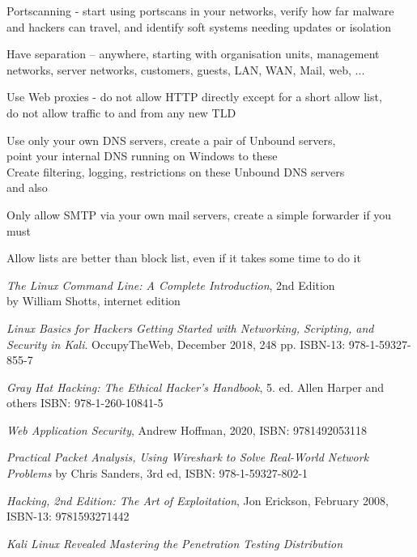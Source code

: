 \documentclass[Screen16to9,17pt]{foils}
\begin{document}


\begin{list2}
\item Portscanning - start using portscans in your networks, verify how far malware and hackers can travel, and identify soft systems needing updates or isolation
\item Have separation -- anywhere, starting with organisation units, management networks, server networks, customers, guests, LAN, WAN, Mail, web, ...
\item Use Web proxies - do not allow HTTP directly except for a short allow list, \\
do not allow traffic to and from any new TLD
\item Use only your own DNS servers, create a pair of Unbound servers, \\
point your internal DNS running on Windows to these\\
Create filtering, logging, restrictions on these Unbound DNS servers\\
 and also 
\item Only allow SMTP via your own mail servers, create a simple forwarder if you must
\end{list2}

Allow lists are better than block list, even if it takes some time to do it

\myquestionspage



\begin{list2}
\item \emph{The Linux Command Line: A Complete Introduction}, 2nd Edition\\
 by William Shotts, internet edition 
\item \emph{Linux Basics for Hackers Getting Started with Networking, Scripting, and Security in Kali}. OccupyTheWeb, December 2018, 248 pp. ISBN-13: 978-1-59327-855-7
\item \emph{Gray Hat Hacking: The Ethical Hacker's Handbook}, 5. ed. Allen Harper and others ISBN: 978-1-260-10841-5
\item \emph{Web Application Security}, Andrew Hoffman, 2020, ISBN: 9781492053118
\item \emph{Practical Packet Analysis, Using Wireshark to Solve Real-World Network Problems}
by Chris Sanders, 3rd ed, ISBN: 978-1-59327-802-1
\item \emph{Hacking, 2nd Edition: The Art of Exploitation}, Jon Erickson, February 2008, ISBN-13: 9781593271442
\item \emph{Kali Linux Revealed Mastering the Penetration Testing Distribution}\\
\end{list2}
\end{document}
